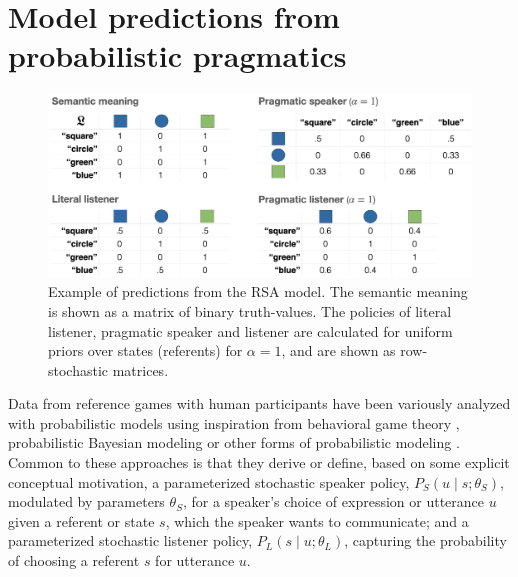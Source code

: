 \documentclass[fleqn]{article}
\begin{document}
\section{Model predictions from probabilistic pragmatics}
\label{sec:model-pred-from}

\begin{figure}[t]
  \centering
  \includegraphics[width = 0.9 \textwidth]{00-pics/RSA-example.png}
  \caption{
    Example of predictions from the RSA model.
    The semantic meaning is shown as a matrix of binary truth-values.
    The policies of literal listener, pragmatic speaker and listener are calculated for uniform priors over states (referents) for $\alpha=1$, and are shown as row-stochastic matrices.
  }
  \label{fig:RSA-example}
\end{figure}

Data from reference games with human participants have been variously analyzed with probabilistic models using inspiration from behavioral game theory \citep[e.g.,][]{DegenFranke2013:Cost-Based-Prag}, probabilistic Bayesian modeling \citep[e.g.,][]{FrankGoodman2012:Predicting-Prag} or other forms of probabilistic modeling \citep[e.g.,][]{GattGompel2013:Are-we-Bayesian}.
Common to these approaches is that they derive or define, based on some explicit conceptual motivation, a parameterized stochastic speaker policy, $P_{S}(u \mid s; \theta_{S})$, modulated by parameters $\theta_{S}$, for a speaker's choice of expression or utterance $u$ given a referent or state $s$, which the speaker wants to communicate;
and a parameterized stochastic listener policy, $P_{L}(s \mid u; \theta_{L})$, capturing the probability of choosing a referent $s$ for utterance $u$.
\end{document}
